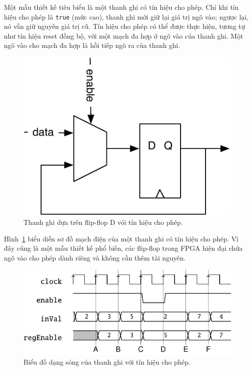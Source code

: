 \documentclass[%
    10pt,
    headinclude, footexclude,
    openright, %
    notitlepage,
    cleardoubleempty,
    headsepline,
    pointlessnumbers,
    bibtotoc, idxtotoc,
    ]{scrbook}
\newcommand{\code}[1]{{\small{\texttt{#1}}}}
\newcommand{\scale}{0.7}
\begin{document}
Một mẫu thiết kế tiêu biểu là một thanh ghi có tín hiệu cho phép. Chỉ khi tín hiệu 
cho phép là \code{true} (mức cao), thanh ghi mới giữ lại giá trị ngõ vào; ngược lại, nó vẫn giữ nguyên giá trị cũ.
Tín hiệu cho phép có thể được thực hiện, tương tự như tín hiệu reset đồng bộ, với một mạch đa hợp ở ngõ 
vào của thanh ghi. Một ngõ vào cho mạch đa hợp là hồi tiếp ngõ ra của thanh ghi.

\begin{figure}
  \centering
  \includegraphics[scale=\scale]{figures/register-enable}
  \caption{Thanh ghi dựa trên flip-flop D vói tín hiệu cho phép.}
  \label{fig:register-enable}
\end{figure}

Hình~\ref{fig:register-enable} biểu diễn sơ đồ mạch điện của một thanh ghi có tín hiệu cho phép.
Vì đây cũng là một mẫu thiết kế phổ biến, các flip-flop trong FPGA hiện đại chứa ngõ vào cho phép 
dành riêng và không cần thêm tài nguyên.

\begin{figure}
  \centering
  \includegraphics[scale=1]{figures/reg_en_wave}
  \caption{Biểu đồ dạng sóng của thanh ghi với tín hiệu cho phép.}
  \label{fig:register-en-wave}
\end{figure}
\end{document}
